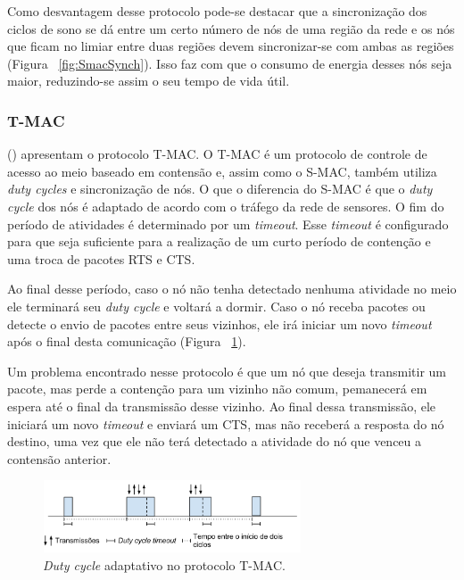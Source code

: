 Como desvantagem desse protocolo pode-se destacar que a sincronização dos ciclos de sono se dá entre um certo número de nós de uma região da rede e os nós que ficam no limiar entre duas regiões devem sincronizar-se com ambas as regiões (Figura ~\ref{fig:SmacSynch}). Isso faz com que o consumo de energia desses nós seja maior, reduzindo-se assim o seu tempo de vida útil.
 
 
\subsubsection{T-MAC} 

 (\citeyear{vanDam:2003:AEM:958491.958512}) apresentam o protocolo T-MAC. O T-MAC é um protocolo de controle de acesso ao meio baseado em contensão e, assim como o S-MAC, também utiliza \emph{duty cycles} e sincronização de nós. O que o diferencia do S-MAC é que o \emph{duty cycle} dos nós é adaptado de acordo com o tráfego da rede de sensores. O fim do período de atividades é determinado por um \emph{timeout}. Esse \emph{timeout} é configurado para que seja suficiente para a realização de um curto período de contenção e uma troca de pacotes RTS e CTS. 

Ao final desse período, caso o nó não tenha detectado nenhuma atividade no meio ele terminará seu \emph{duty cycle} e voltará a dormir. Caso o nó receba pacotes ou detecte o envio de pacotes entre seus vizinhos, ele irá iniciar um novo \emph{timeout} após o final desta comunicação (Figura ~\ref{fig:TmacDutyCycles}). 

Um problema encontrado nesse protocolo é que um nó que deseja transmitir um pacote, mas perde a contenção para um vizinho não comum, pemanecerá em espera até o final da transmissão desse vizinho. Ao final dessa transmissão, ele iniciará um novo \emph{timeout} e enviará um CTS, mas não receberá a resposta do nó destino, uma vez que ele não terá detectado a atividade do nó que venceu a contensão anterior.

\begin{figure}[!htb]
\centering
\includegraphics[width=290px,height=81px]{./Pictures/T-MACDutyCycles.png}
\caption{\emph{Duty cycle} adaptativo no protocolo T-MAC.} %
\label{fig:TmacDutyCycles} %
\end{figure}


